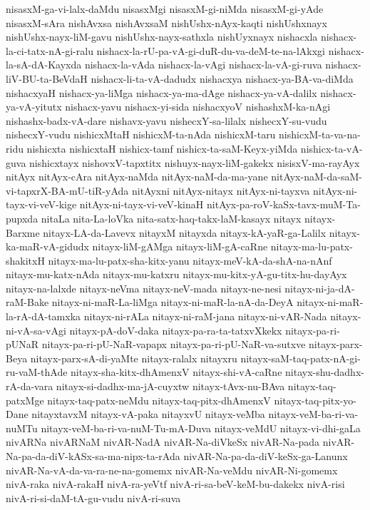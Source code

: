 {nisasxM-ga-vi-lalx-daMdu
nisasxMgi
nisasxM-gi-niMda
nisasxM-gi-yAde
nisasxM-sAra
nishAvxsa
nishAvxsaM
nishUshx-nAyx-kaqti
nishUshxnayx
nishUshx-nayx-liM-gavu
nishUshx-nayx-sathxla
nishUyxnayx
nishacxla
nishacx-la-ci-tatx-nA-gi-ralu
nishacx-la-rU-pa-vA-gi-duR-du-va-deM-te-na-lAkxgi
nishacx-la-sA-dA-Kayxda
nishacx-la-vAda
nishacx-la-vAgi
nishacx-la-vA-gi-ruva
nishacx-liV-BU-ta-BeVdaH
nishacx-li-ta-vA-dadudx
nishacxya
nishacx-ya-BA-va-diMda
nishacxyaH
nishacx-ya-liMga
nishacx-ya-ma-dAge
nishacx-ya-vA-dalilx
nishacx-ya-vA-yitutx
nishacx-yavu
nishacx-yi-sida
nishacxyoV
nishashxM-ka-nAgi
nishashx-badx-vA-dare
nishavx-yavu
nishecxY-sa-lilalx
nishecxY-su-vudu
nishecxY-vudu
nishicxMtaH
nishicxM-ta-nAda
nishicxM-taru
nishicxM-ta-va-na-ridu
nishicxta
nishicxtaH
nishicx-tamf
nishicx-ta-saM-Keyx-yiMda
nishicx-ta-vA-guva
nishicxtayx
nishovxV-tapxtitx
nishuyx-nayx-liM-gakekx
nisisxV-ma-rayAyx
nitAyx
nitAyx-cAra
nitAyx-naMda
nitAyx-naM-da-ma-yane
nitAyx-naM-da-saM-vi-tapxrX-BA-mU-tiR-yAda
nitAyxni
nitAyx-nitayx
nitAyx-ni-tayxva
nitAyx-ni-tayx-vi-veV-kige
nitAyx-ni-tayx-vi-veV-kinaH
nitAyx-pa-roV-kaSx-tavx-muM-Ta-pupxda
nitaLa
nita-La-loVka
nita-satx-haq-takx-laM-kasayx
nitayx
nitayx-Barxme
nitayx-LA-da-Lavevx
nitayxM
nitayxda
nitayx-kA-yaR-ga-Lalilx
nitayx-ka-maR-vA-gidudx
nitayx-liM-gAMga
nitayx-liM-gA-caRne
nitayx-ma-lu-patx-shakitxH
nitayx-ma-lu-patx-sha-kitx-yanu
nitayx-meV-kA-da-shA-na-nAnf
nitayx-mu-katx-nAda
nitayx-mu-katxru
nitayx-mu-kitx-yA-gu-titx-hu-dayAyx
nitayx-na-lalxde
nitayx-neVma
nitayx-neV-mada
nitayx-ne-nesi
nitayx-ni-ja-dA-raM-Bake
nitayx-ni-maR-La-liMga
nitayx-ni-maR-la-nA-da-DeyA
nitayx-ni-maR-la-rA-dA-tamxka
nitayx-ni-rALa
nitayx-ni-raM-jana
nitayx-ni-vAR-Nada
nitayx-ni-vA-sa-vAgi
nitayx-pA-doV-daka
nitayx-pa-ra-ta-tatxvXkekx
nitayx-pa-ri-pUNaR
nitayx-pa-ri-pU-NaR-vapapx
nitayx-pa-ri-pU-NaR-va-sutxve
nitayx-parx-Beya
nitayx-parx-sA-di-yaMte
nitayx-ralalx
nitayxru
nitayx-saM-taq-patx-nA-gi-ru-vaM-thAde
nitayx-sha-kitx-dhAmenxV
nitayx-shi-vA-caRne
nitayx-shu-dadhx-rA-da-vara
nitayx-si-dadhx-ma-jA-cuyxtw
nitayx-tAvx-nu-BAva
nitayx-taq-patxMge
nitayx-taq-patx-neMdu
nitayx-taq-pitx-dhAmenxV
nitayx-taq-pitx-yo-Dane
nitayxtavxM
nitayx-vA-paka
nitayxvU
nitayx-veMba
nitayx-veM-ba-ri-va-nuMTu
nitayx-veM-ba-ri-va-nuM-Tu-mA-Duva
nitayx-veMdU
nitayx-vi-dhi-gaLa
nivARNa
nivARNaM
nivAR-NadA
nivAR-Na-diVkeSx
nivAR-Na-pada
nivAR-Na-pa-da-diV-kASx-sa-ma-nipx-ta-rAda
nivAR-Na-pa-da-diV-keSx-ga-Lanunx
nivAR-Na-vA-da-va-ra-ne-na-gomemx
nivAR-Na-veMdu
nivAR-Ni-gomemx
nivA-raka
nivA-rakaH
nivA-ra-yeVtf
nivA-ri-sa-beV-keM-bu-dakekx
nivA-risi
nivA-ri-si-daM-tA-gu-vudu
nivA-ri-suva
}
